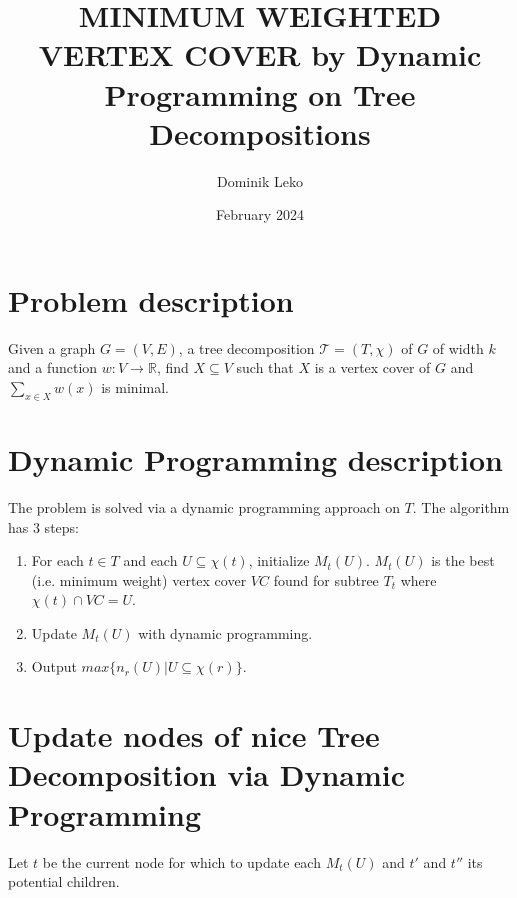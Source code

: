 \documentclass{article}
\title{MINIMUM WEIGHTED VERTEX COVER by Dynamic Programming on Tree Decompositions}
\author{Dominik Leko}
\date{February 2024}
\begin{document}
\maketitle

\section{Problem description}

Given a graph $G = (V, E)$, a tree decomposition $\mathcal{T} = (T, \chi)$ of $G$ of width $k$ and a function $w : V \rightarrow \mathbb{R}$, find $X \subseteq V$ such that $X$ is a vertex cover of $G$ and $\sum_{x \in X} w(x)$ is minimal.

\section{Dynamic Programming description}

The problem is solved via a dynamic programming approach on $T$. The algorithm has 3 steps:

\begin{enumerate}
    \item For each $t \in T$ and each $U \subseteq \chi(t)$, initialize $M_t(U)$. $M_t(U)$ is the best (i.e. minimum weight) vertex cover $VC$ found for subtree $T_t$ where $\chi(t) \cap VC = U$.
    \item Update $M_t(U)$ with dynamic programming.
    \item Output $max \{n_r(U) | U \subseteq \chi(r)\}$.
\end{enumerate}

\section{Update nodes of nice Tree Decomposition via Dynamic Programming}

Let $t$ be the current node for which to update each $M_t(U)$ and $t'$ and $t''$ its potential children.
\end{document}
